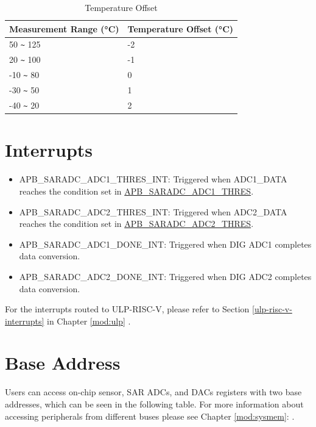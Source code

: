 \documentclass[main\_\_EN.tex]{subfiles}
\begin{document}
\begin{longtable}[c]{|p{4cm}|p{4cm}|}
    \caption{Temperature Offset}
    \label{tab:tsensor-dac}
    \\\hline
    \rowcolor{lightgray}
    Measurement Range (°C)  & Temperature Offset (°C) \\\hline
    50 \verb+~+ 125 & -2 \\\hline
    20 \verb+~+ 100 & -1 \\\hline
    -10 \verb+~+ 80 & 0 \\\hline
    -30 \verb+~+ 50 & 1 \\\hline
    -40 \verb+~+ 20 & 2 \\\hline
\end{longtable}

\section{Interrupts}

\begin{itemize}
   \item \label{interreupt:SARADCTHRESINT1}APB\_SARADC\_ADC1\_THRES\_INT: Triggered when ADC1\_DATA reaches the condition set in \hyperref[fielddesc:APBSARADCADC1THRES]{APB\_SARADC\_ADC1\_THRES}.
    \item \label{interreupt:SARADCTHRESINT2}APB\_SARADC\_ADC2\_THRES\_INT: Triggered when ADC2\_DATA reaches the condition set in \hyperref[fielddesc:APBSARADCADC2THRES]{APB\_SARADC\_ADC2\_THRES}.
   \item \label{interreupt:SARADCDONEINT1}APB\_SARADC\_ADC1\_DONE\_INT: Triggered when DIG ADC1 completes data conversion.
   \item \label{interreupt:SARADCDONEINT2}APB\_SARADC\_ADC2\_DONE\_INT: Triggered when DIG ADC2 completes data conversion.
\end{itemize}
For the interrupts routed to ULP-RISC-V, please refer to Section \ref{ulp-risc-v-interrupts} \textit{} in Chapter \ref{mod:ulp} \textit{}.

\section{Base Address}\label{base_address_new}
Users can access on-chip sensor, SAR ADCs, and DACs registers with two base addresses, which can be seen in the following table. For more information about accessing peripherals from different buses please see Chapter \ref{mod:sysmem}: \textit{}.
\end{document}
